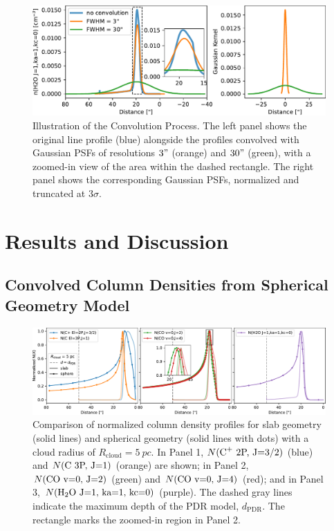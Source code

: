 \documentclass[12pt,a4paper]{article}
\newcommand{\mr}{\mathrm}
\begin{document}
\begin{figure}[h]
    \centering
    \includegraphics[width=.88\textwidth,keepaspectratio]{convolution.pdf}
    \caption{Illustration of the Convolution Process. The left panel shows the original line profile (blue) alongside the profiles convolved with Gaussian PSFs of resolutions $3"$ (orange) and $30"$ (green), with a zoomed-in view of the area within the dashed rectangle. The right panel shows the corresponding Gaussian PSFs, normalized and truncated at $3\sigma$.} \label{fig:convolution}
\end{figure}

\section{Results and Discussion}
\subsection{Convolved Column Densities from Spherical Geometry Model}

\begin{figure}
    \centering
    \includegraphics[width=\textwidth,keepaspectratio]{column_densities.pdf}
    \caption{Comparison of normalized column density profiles for slab geometry (solid lines) and spherical geometry (solid lines with dots) with a cloud radius of $R_\mr{cloud} = \qty{5}{pc}$. In Panel 1, $N(\ce{C^+}\ \text{2P, J=3/2})$ (blue) and $N(\ce{C}\ \text{3P, J=1})$ (orange) are shown; in Panel 2, $N(\ce{CO}\ \text{v=0, J=2})$ (green) and $N(\ce{CO}\ \text{v=0, J=4})$ (red); and in Panel 3, $N(\ce{H2O}\ \text{J=1, ka=1, kc=0})$ (purple). The dashed gray lines indicate the maximum depth of the PDR model, $d_\mr{PDR}$. The rectangle marks the zoomed-in region in Panel 2.} \label{fig:colden}  
\end{figure}
\end{document}
